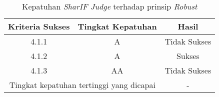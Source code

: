 \begin{table}[H]
	\centering
	\caption{Kepatuhan \textit{SharIF Judge} terhadap prinsip \textit{Robust}}
	\label{tab:kepatuhan_sharif_judge_robust}
	\begin{tabular}{|c|c|c|}
		\hline
		Kriteria Sukses & Tingkat Kepatuhan & Hasil\\
		\hline
		\rowcolor{Pink} 4.1.1 & A & Tidak Sukses\\
		4.1.2 & A & Sukses\\
		\rowcolor{LightRed} 4.1.3 & AA & Tidak Sukses\\
		\hline
		\multicolumn{2}{|c|}{Tingkat kepatuhan tertinggi yang dicapai} & - \\
		\hline
	\end{tabular}
\end{table}

